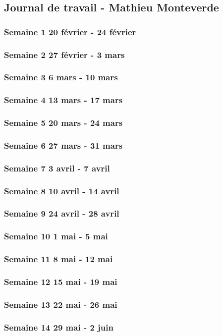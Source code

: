 \subsection{Journal de travail - Mathieu Monteverde}

\subsubsection{Semaine 1 20 février - 24 février}
\subsubsection{Semaine 2 27 février - 3 mars}
\subsubsection{Semaine 3 6 mars - 10 mars}
\subsubsection{Semaine 4 13 mars - 17 mars}
\subsubsection{Semaine 5 20 mars - 24 mars}
\subsubsection{Semaine 6 27 mars - 31 mars}
\subsubsection{Semaine 7 3 avril - 7 avril}
\subsubsection{Semaine 8 10 avril - 14 avril}
\subsubsection{Semaine 9 24 avril - 28 avril}
\subsubsection{Semaine 10 1 mai - 5 mai}
\subsubsection{Semaine 11 8 mai - 12 mai}
\subsubsection{Semaine 12 15 mai - 19 mai}
\subsubsection{Semaine 13 22 mai - 26 mai}
\subsubsection{Semaine 14 29 mai - 2 juin}



